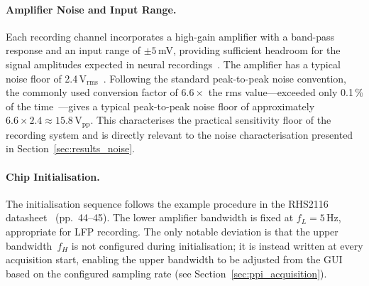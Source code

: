 \paragraph{Amplifier Noise and Input Range.}
Each recording channel incorporates a high-gain amplifier with a band-pass
response and an input range of $\pm5$\,mV, providing sufficient headroom for
the signal amplitudes expected in neural recordings~\cite{intan_rhs2116_datasheet}.
The amplifier has a typical noise floor of 2.4\,\textmu{}V$_\text{rms}$~\cite{intan_rhs2116_datasheet}.
Following the standard peak-to-peak noise convention, the commonly used conversion
factor of $6.6\times$ the rms value---exceeded only 0.1\,\% of the
time~\cite[Chapter~1]{zumbahlen2011linear}\cite[Chapter~1]{jung2004op}---gives
a typical peak-to-peak noise floor of approximately
$6.6 \times 2.4 \approx 15.8$\,\textmu{}V$_\text{pp}$.
This characterises the practical sensitivity floor of the recording system
and is directly relevant to the noise characterisation presented in
Section~\ref{sec:results_noise}.

\paragraph{Chip Initialisation.}
The initialisation sequence follows the example procedure in the RHS2116
datasheet~\cite{intan_rhs2116_datasheet} (pp.~44--45). The lower amplifier bandwidth is
fixed at $f_L = 5$\,Hz, appropriate for LFP recording. The only notable deviation is
that the upper bandwidth~$f_H$ is not configured during initialisation; it is instead
written at every acquisition start, enabling the
upper bandwidth to be adjusted from the GUI based on the configured sampling rate
(see Section~\ref{sec:ppi_acquisition}).

